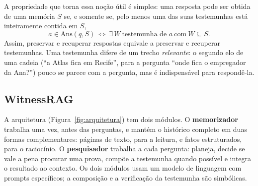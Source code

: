 \documentclass[11pt]{article}
\begin{document}
A propriedade que torna essa noção útil é simples: uma resposta pode ser
obtida de uma memória $S$ se, e somente se, pelo menos uma das suas
testemunhas está inteiramente contida em $S$,
\begin{equation}
a\in\mathrm{Ans}(q,S)\ \iff\ \exists\,W\ \text{testemunha de } a\ \text{com}\ W\subseteq S.
\label{eq:propriedade}
\end{equation}
Assim, preservar e recuperar respostas equivale a preservar e recuperar
testemunhas. Uma testemunha difere de um trecho \emph{relevante}: o segundo
elo de uma cadeia (``a Atlas fica em Recife'', para a pergunta ``onde fica o
empregador da Ana?'') pouco se parece com a pergunta, mas é indispensável
para respondê-la.

\subsection{WitnessRAG}

A arquitetura (Figura~\ref{fig:arquitetura}) tem dois módulos. O
\textbf{memorizador} trabalha uma vez, antes das perguntas, e mantém o
histórico completo em duas formas complementares: páginas de texto, para a
leitura, e fatos estruturados, para o raciocínio. O \textbf{pesquisador}
trabalha a cada pergunta: planeja, decide se vale a pena procurar uma prova,
compõe a testemunha quando possível e integra o resultado ao contexto. Os dois
módulos usam um modelo de linguagem com prompts específicos; a composição e a
verificação da testemunha são simbólicas.
\end{document}
